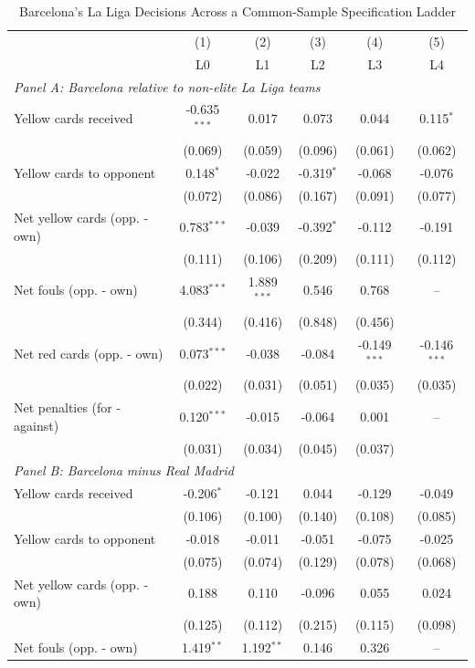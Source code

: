 \begin{table}[htbp]\centering
\caption{Barcelona's La Liga Decisions Across a Common-Sample Specification Ladder
\label{tab:barcelona-style-ladder}}
\footnotesize
\begin{tabular}{lccccc}
\toprule
 & (1) & (2) & (3) & (4) & (5) \\
 & L0 & L1 & L2 & L3 & L4 \\
\midrule
\multicolumn{6}{l}{\textit{Panel A: Barcelona relative to non-elite La Liga teams}} \\
Yellow cards received & -0.635$^{***}$ & 0.017 & 0.073 & 0.044 & 0.115$^{*}$ \\
 & (0.069) & (0.059) & (0.096) & (0.061) & (0.062) \\
Yellow cards to opponent & 0.148$^{*}$ & -0.022 & -0.319$^{*}$ & -0.068 & -0.076 \\
 & (0.072) & (0.086) & (0.167) & (0.091) & (0.077) \\
Net yellow cards (opp. - own) & 0.783$^{***}$ & -0.039 & -0.392$^{*}$ & -0.112 & -0.191 \\
 & (0.111) & (0.106) & (0.209) & (0.111) & (0.112) \\
Net fouls (opp. - own) & 4.083$^{***}$ & 1.889$^{***}$ & 0.546 & 0.768 & -- \\
 & (0.344) & (0.416) & (0.848) & (0.456) &  \\
Net red cards (opp. - own) & 0.073$^{***}$ & -0.038 & -0.084 & -0.149$^{***}$ & -0.146$^{***}$ \\
 & (0.022) & (0.031) & (0.051) & (0.035) & (0.035) \\
Net penalties (for - against) & 0.120$^{***}$ & -0.015 & -0.064 & 0.001 & -- \\
 & (0.031) & (0.034) & (0.045) & (0.037) &  \\
\midrule
\multicolumn{6}{l}{\textit{Panel B: Barcelona minus Real Madrid}} \\
Yellow cards received & -0.206$^{*}$ & -0.121 & 0.044 & -0.129 & -0.049 \\
 & (0.106) & (0.100) & (0.140) & (0.108) & (0.085) \\
Yellow cards to opponent & -0.018 & -0.011 & -0.051 & -0.075 & -0.025 \\
 & (0.075) & (0.074) & (0.129) & (0.078) & (0.068) \\
Net yellow cards (opp. - own) & 0.188 & 0.110 & -0.096 & 0.055 & 0.024 \\
 & (0.125) & (0.112) & (0.215) & (0.115) & (0.098) \\
Net fouls (opp. - own) & 1.419$^{**}$ & 1.192$^{**}$ & 0.146 & 0.326 & -- \\

\end{tabular}
\end{table}
